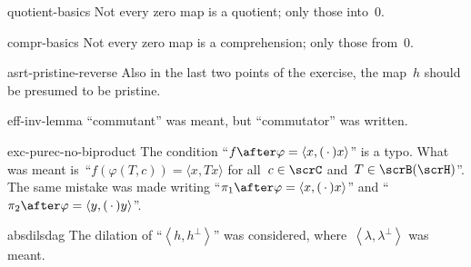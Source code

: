 \begin{erratum}{quotient-basics}%
Not every zero map is a quotient; only those into~$0$.
\end{erratum}
\begin{erratum}{compr-basics}%
Not every zero map is a comprehension; only those from~$0$.
\end{erratum}
\begin{erratum}{asrt-pristine-reverse}%
Also in the last two points of the exercise,
    the map~$h$ should be presumed to be pristine.
\end{erratum}
\begin{erratum}{eff-inv-lemma}%
``commutant'' was meant, but ``commutator'' was written.
\end{erratum}
\begin{erratum}{exc-purec-no-biproduct}%
The condition
    ``$f \after \varphi = \langle x, (\,\cdot\,) x\rangle$''
        is a typo.
        What was meant is~``$f (\varphi(T, c)) = \langle x, T x\rangle $
        for all~$c \in \scrC$
        and~$T \in \scrB(\scrH)$''.
The same mistake was made writing
    ``$\pi_1 \after \varphi = \langle x, (\,\cdot\,) x\rangle$'' and
    ``$\pi_2 \after \varphi = \langle y, (\,\cdot\,) y\rangle$''.
\end{erratum}
\begin{erratum}{absdilsdag}%
The dilation of ``$\left<h,h^\perp\right>$''
    was considered,
        where~$\left<\lambda,\lambda^\perp\right>$ was meant.
\end{erratum}

